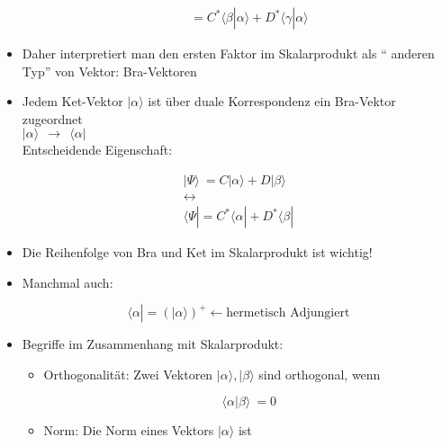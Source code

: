 \documentclass[10pt,article,colorback,accentcolor=tud9d]{scrartcl}
\begin{document}
\begin{itemize}
\begin{fleqn}
\begin{itemize}
\begin{equation}
\begin{aligned}
=C^*\langle \beta\left|\right.\alpha\rangle  +D^*\langle \gamma\left|\right.\alpha\rangle 
\end{aligned}
\end{equation}
\end{itemize}
\end{fleqn}
\item Daher interpretiert man den ersten Faktor im Skalarprodukt als "`
anderen Typ"' von Vektor: Bra-Vektoren
\item Jedem Ket-Vektor $\left|\right.\alpha\rangle $ ist über duale Korrespondenz 
ein Bra-Vektor zugeordnet\\
$\left|\right.\alpha\rangle  \ \ \rightarrow \ \ \langle \alpha\left|\right.$\\
Entscheidende Eigenschaft:
\begin{fleqn}
\begin{equation}
\begin{aligned}
\left|\right.\Psi\rangle  \ = C \left|\right.\alpha\rangle  +D\left|\right.\beta\rangle \\
\longleftrightarrow\\
\langle \Psi\left|\right.=C^*\langle \alpha\left|\right. +D^* \langle \beta\left|\right.
\end{aligned}
\end{equation}
\end{fleqn}
\item Die Reihenfolge von Bra und Ket im Skalarprodukt ist wichtig!
\item Manchmal auch:
\begin{fleqn}
\begin{equation}
\langle \alpha\left|\right.=(\left|\right.\alpha\rangle )^+ \leftarrow \text{hermetisch 
Adjungiert}
\end{equation}
\end{fleqn}
\item Begriffe im Zusammenhang mit Skalarprodukt:
\begin{itemize}
\item Orthogonalität: Zwei Vektoren $\left|\right.\alpha\rangle , \left|\right.\beta\rangle 
$ sind orthogonal, wenn
\begin{fleqn}
\begin{equation}
\langle \alpha\left|\right.\beta\rangle  \ =0
\end{equation}
\end{fleqn}
\item Norm: Die Norm eines Vektors $\left|\right.\alpha\rangle $ ist 
\begin{fleqn}

\end{fleqn}
\end{itemize}
\end{itemize}
\end{document}
